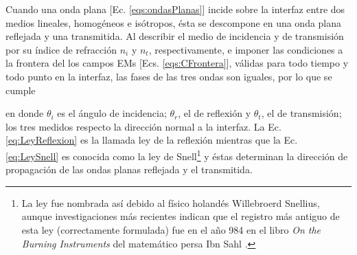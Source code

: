 Cuando una onda plana [Ec. \eqref{eqs:ondasPlanas}] incide sobre la interfaz entre dos medios lineales, homogéneos e isótropos, ésta se descompone en una onda plana reflejada y una transmitida. Al describir el medio de incidencia y de transmisión por su índice de refracción $n_i$ y $n_t$, respectivamente, e imponer las condiciones a la frontera del los campos EMs [Ecs. \eqref{eqs:CFrontera}], válidas para todo tiempo y todo punto en la interfaz, las fases de las tres ondas son iguales, por lo que se cumple \vspace*{-.75em} 
%
	\begin{tcolorbox}[title = Ley de la reflexión y ley de Snell ]
	\end{tcolorbox}	 \vspace*{-.75em}\noindent
%
en donde $\theta_i$ es el ángulo de incidencia; $\theta_r$, el de reflexión y $\theta_t$, el de transmisión; los tres medidos respecto la dirección normal a la interfaz. La Ec. \eqref{eq:LeyReflexion} es la llamada ley de la reflexión mientras que la Ec. \eqref{eq:LeySnell} es conocida como la ley de Snell\footnote{La ley fue nombrada así debido al físico holandés Willebroerd Snellius, aunque investigaciones más recientes indican que el registro más antiguo de esta ley (correctamente formulada) fue en el año 984 en el libro \emph{On the Burning Instruments} del matemático persa Ibn Sahl \cite{kwan2002really}.} y éstas determinan la dirección de propagación de las ondas planas reflejada y el transmitida.

